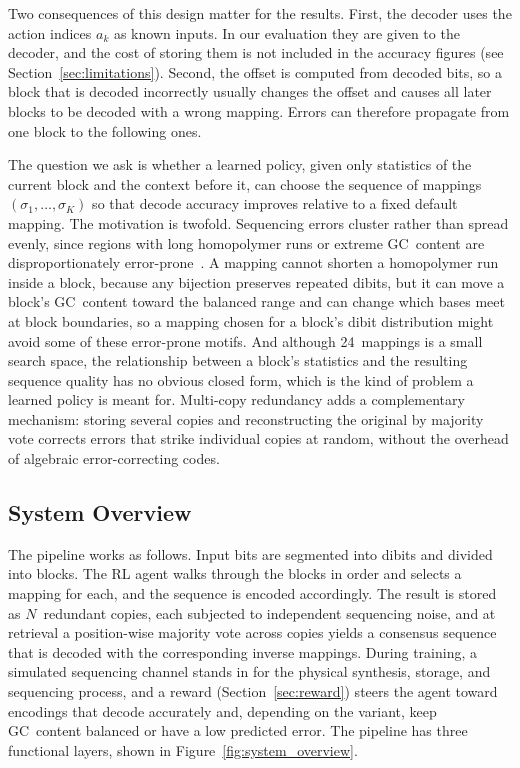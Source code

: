 \documentclass[entropy,article,submit,moreauthors]{Definitions/mdpi}
\begin{document}
Two consequences of this design matter for the results. First, the decoder uses the action indices $a_k$ as known inputs. In our evaluation they are given to the decoder, and the cost of storing them is not included in the accuracy figures (see Section~\ref{sec:limitations}). Second, the offset is computed from decoded bits, so a block that is decoded incorrectly usually changes the offset and causes all later blocks to be decoded with a wrong mapping. Errors can therefore propagate from one block to the following ones.

The question we ask is whether a learned policy, given only statistics of the current block and the context before it, can choose the sequence of mappings $(\sigma_1, \ldots, \sigma_K)$ so that decode accuracy improves relative to a fixed default mapping. The motivation is twofold. Sequencing errors cluster rather than spread evenly, since regions with long homopolymer runs or extreme GC~content are disproportionately error-prone~\cite{erlich2017, ross2013}. A mapping cannot shorten a homopolymer run inside a block, because any bijection preserves repeated dibits, but it can move a block's GC~content toward the balanced range and can change which bases meet at block boundaries, so a mapping chosen for a block's dibit distribution might avoid some of these error-prone motifs. And although 24~mappings is a small search space, the relationship between a block's statistics and the resulting sequence quality has no obvious closed form, which is the kind of problem a learned policy is meant for. Multi-copy redundancy adds a complementary mechanism: storing several copies and reconstructing the original by majority vote corrects errors that strike individual copies at random, without the overhead of algebraic error-correcting codes.

\subsection{System Overview}

The pipeline works as follows. Input bits are segmented into dibits and divided into blocks. The RL agent walks through the blocks in order and selects a mapping for each, and the sequence is encoded accordingly. The result is stored as $N$~redundant copies, each subjected to independent sequencing noise, and at retrieval a position-wise majority vote across copies yields a consensus sequence that is decoded with the corresponding inverse mappings. During training, a simulated sequencing channel stands in for the physical synthesis, storage, and sequencing process, and a reward (Section~\ref{sec:reward}) steers the agent toward encodings that decode accurately and, depending on the variant, keep GC~content balanced or have a low predicted error. The pipeline has three functional layers, shown in Figure~\ref{fig:system_overview}.
\end{document}
